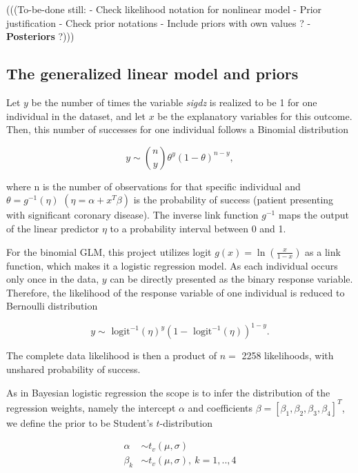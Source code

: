 \documentclass[
  letterpaper,
  DIV=11,
  numbers=noendperiod]{scrartcl}
\begin{document}
(((To-be-done still: - Check likelihood notation for nonlinear model -
Prior justification - Check prior notations - Include priors with own
values ? - \textbf{Posteriors} ?)))

\hypertarget{the-generalized-linear-model-and-priors}{%
\subsection{The generalized linear model and
priors}\label{the-generalized-linear-model-and-priors}}

Let \(y\) be the number of times the variable \emph{sigdz} is realized
to be 1 for one individual in the dataset, and let \(x\) be the
explanatory variables for this outcome. Then, this number of successes
for one individual follows a Binomial distribution

\[
y \sim \binom{n}{y}\theta^y(1-\theta)^{n-y},
\]

where n is the number of observations for that specific individual and
\(\theta = g^{-1}(\eta)\) \((\eta = \alpha + x^{T} \beta)\) is the
probability of success (patient presenting with significant coronary
disease). The inverse link function \(g^{-1}\) maps the output of the
linear predictor \(\eta\) to a probability interval between 0 and 1.

For the binomial GLM, this project utilizes logit
\(g(x) = \ln(\frac{x}{1-x})\) as a link function, which makes it a
logistic regression model. As each individual occurs only once in the
data, \(y\) can be directly presented as the binary response variable.
Therefore, the likelihood of the response variable of one individual is
reduced to Bernoulli distribution

\[
y \sim \text{ logit}^{-1}(\eta)^y(1-\text{ logit}^{-1}(\eta))^{1-y}.
\]

The complete data likelihood is then a product of \(n =\) 2258
likelihoods, with unshared probability of success.

As in Bayesian logistic regression the scope is to infer the
distribution of the regression weights, namely the intercept \(\alpha\)
and coefficients \(\beta = [\beta_1, \beta_2, \beta_3, \beta_4]^T\), we
define the prior to be Student's \(t\)-distribution

\[
\begin{aligned} 
\alpha &\sim t_v(\mu, \sigma) \\ 
\beta_k &\sim t_v(\mu, \sigma), \ k=1,..,4 \\ 
\end{aligned} 
\]
\end{document}
